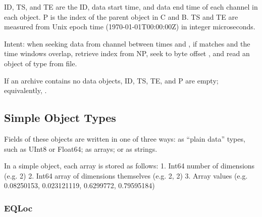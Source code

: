 \documentclass[letterpaper,11pt,english]{sphinxmanual}
\begin{document}
ID, TS, and TE are the ID, data start time, and data end time of each channel
in each object. P is the index of the parent object in C and B. TS and TE are
measured from Unix epoch time (1970-01-01T00:00:00Z) in integer microseconds.

Intent: when seeking data from channel  between times  and ,
if  matches  and the time windows overlap, retrieve index
 from NP, seek to byte offset , and read an object of
type  from file.

If an archive contains no data objects, ID, TS, TE, and P are empty;
equivalently, .


\subsection{Simple Object Types}
\label{\detokenize{src/Appendices/seisio_file_format:simple-object-types}}
Fields of these objects are written in one of three ways: as “plain data” types,
such as UInt8 or Float64; as arrays; or as strings.

In a simple object, each array is stored as follows:
1. Int64 number of dimensions (e.g. 2)
2. Int64 array of dimensions themselves (e.g. 2, 2)
3. Array values (e.g. 0.08250153, 0.023121119, 0.6299772, 0.79595184)


\subsubsection{EQLoc}
\label{\detokenize{src/Appendices/seisio_file_format:eqloc}}
\end{document}

